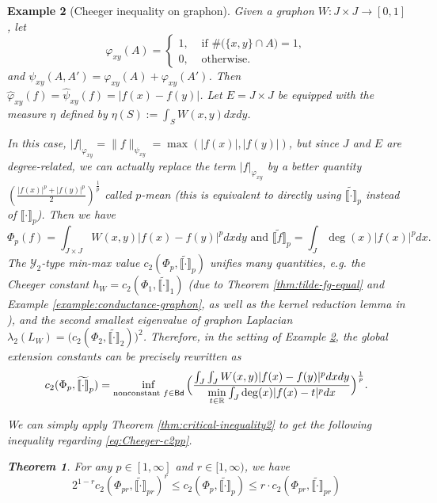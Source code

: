 \documentclass[12pt,a4paper]{article}
\newtheorem{theorem}{Theorem}[section]
\newtheorem{example}[theorem]{Example}
\begin{document}
\begin{example}[Cheeger inequality on graphon] \label{exam:nonlocal-graphon}
Given a graphon $W:J\times J\to [0,1]$, %
let $$\varphi_{xy}(A)=\begin{cases}
1,&\text{ if } \#\big(\{x,y\}\cap A\big)=1,\\
0,&\text{ otherwise}.
\end{cases}%
$$ and  %
$\psi_{xy}(A,A')=%
\varphi_{xy}(A)+\varphi_{xy}(A')%
$. %
Then $\widehat{\varphi}_{xy}(f)=\widehat{\psi}_{xy}(f)=
|f(x)-f(y)|$. 
Let $E=J\times J$ be equipped with the measure $\eta$ defined by   $\eta(S):=\int_SW(x,y)dxdy$. 

In this case, $|f|_{\varphi_{xy}}=\|f\|_{\psi_{xy}}=\max(|f(x)|,|f(y)|)$, but since $J$ and $E$ are degree-related,  we can actually replace the term $|f|_{\varphi_{xy}}$ by a better quantity $(\frac{|f(x)|^p+|f(y)|^p}{2})^{\frac1p}$ called $p$-mean (this is equivalent to directly using $\widetilde{\llbracket \cdot\rrbracket}_p$ instead of $\llbracket \cdot\rrbracket_p$). 
Then we have
$$\Phi_p(f)=\int_{J\times J}W(x,y)|f(x)-f(y)|^pdxdy\text{ and }\widetilde{\llbracket f\rrbracket}_p=\int_J \deg(x)|f(x)|^pdx. $$
The $\mathcal{Y}_2$-type min-max value $c_2(\Phi_p,\widetilde{\llbracket \cdot\rrbracket}_p)$ unifies many quantities, e.g. the Cheeger constant $h_W=c_2(\Phi_1,\widetilde{\llbracket \cdot\rrbracket}_1)$ (due to Theorem \ref{thm:tilde-fg-equal} and Example \ref{example:conductance-graphon}, as well as the kernel reduction lemma in \cite{zhang/dual}), and the second smallest eigenvalue of graphon Laplacian $\lambda_2(L_W)=\big(c_2(\Phi_2,\widetilde{\llbracket \cdot\rrbracket}_2)\big)^2$.  Therefore, in the setting of Example \ref{exam:nonlocal-graphon}, the global extension constants can be precisely rewritten as 
\begin{equation}\label{eq:Cheeger-c2pp}
c_2(\Phi_p,\widetilde{\llbracket \cdot\rrbracket}_p)=\inf_{\text{nonconstant }f\in {\sf Bd}}\Big(\frac{\int_J\int_JW(x,y)|f(x)-f(y)|^pdxdy}{\min\limits_{t\in\mathbb{R}}\int_{J} \deg(x)|f(x)-t|^pdx}\Big)^{\frac1p}.
\end{equation}

We can simply apply Theorem \ref{thm:critical-inequality2} to get the following inequality regarding \eqref{eq:Cheeger-c2pp}. 
\begin{theorem}\label{thm:Cheeger-graphon}
For any $p\in[1,\infty]$ and $r\in[1,\infty)$, we have \begin{equation}\label{eq:p-Cheeger}
2^{1-r}c_2(\Phi_{pr},\widetilde{\llbracket \cdot\rrbracket}_{pr})^r\le c_2(\Phi_p,\widetilde{\llbracket \cdot\rrbracket}_p)\le r\cdot c_2(\Phi_{pr},\widetilde{\llbracket \cdot\rrbracket}_{pr})    
\end{equation}    
\end{theorem}

\end{example}
\end{document}
